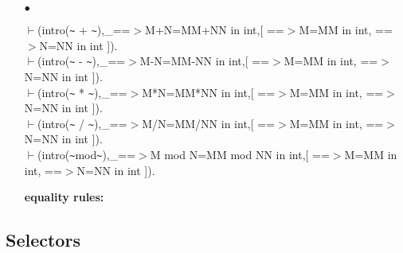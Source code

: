 \documentclass[11pt]{report}
\begin{document}
\begin{enumerate}
 {\bf membership rules:}
  
 \item[$\bullet$]
\begin{sf}\begin{tabbing}
$\vdash$(intro({\verb`~`} + {\verb`~`}),\_\hspace{0.1em}==$>$M+N=MM+NN in int,[ ==$>$M=MM in int, ==$>$N=NN in int ]).\\[-0.15ex]
$\vdash$(intro({\verb`~`} - {\verb`~`}),\_\hspace{0.1em}==$>$M-N=MM-NN in int,[ ==$>$M=MM in int, ==$>$N=NN in int ]).\\[-0.15ex]
$\vdash$(intro({\verb`~`} * {\verb`~`}),\_\hspace{0.1em}==$>$M*N=MM*NN in int,[ ==$>$M=MM in int, ==$>$N=NN in int ]).\\[-0.15ex]
$\vdash$(intro({\verb`~`} / {\verb`~`}),\_\hspace{0.1em}==$>$M/N=MM/NN in int,[ ==$>$M=MM in int, ==$>$N=NN in int ]).\\[-0.15ex]
$\vdash$(intro({\verb`~`}mod{\verb`~`}),\_\hspace{0.1em}==$>$M mod N=MM mod NN in int,[ ==$>$M=MM in int, ==$>$N=NN in int ]).
\end{tabbing}\end{sf}

 {\bf equality rules:}
 \end{enumerate}
  
 \subsection{Selectors}
  
\end{document}
